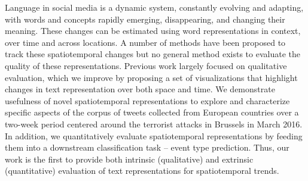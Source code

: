Language in social media is a dynamic system, constantly evolving and adapting, with words and concepts rapidly emerging, disappearing, and changing their meaning. These changes can be estimated using word representations in context, over time and across locations. A number of methods have been proposed to track these spatiotemporal changes but no general method exists to evaluate the quality of these representations. Previous work largely focused on qualitative evaluation, which we improve by proposing a set of visualizations that highlight changes in text representation over both space and time. We demonstrate usefulness of novel spatiotemporal representations to explore and characterize specific aspects of the corpus of tweets collected from European countries over a two-week period centered around the terrorist attacks in Brussels in March 2016. In addition, we quantitatively evaluate spatiotemporal representations by feeding them into a downstream classification task -- event type prediction. Thus, our work is the first to provide both intrinsic (qualitative) and extrinsic (quantitative) evaluation of text representations for spatiotemporal trends.
